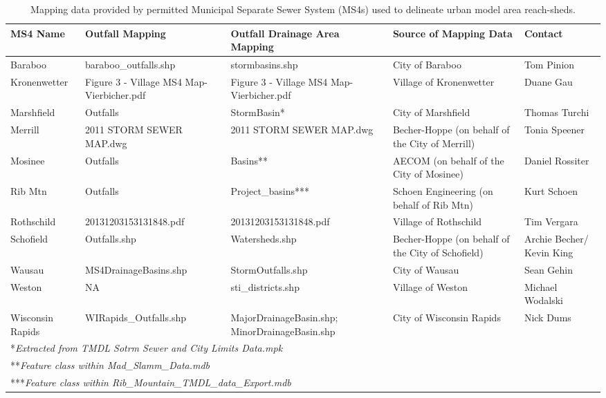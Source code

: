 \begin{landscape}
\begin{table}
\begin{center}
	\caption[Mapping data provided by permitted Municipal Separate Sewer System]{Mapping data provided by permitted Municipal Separate Sewer System (MS4s) used to delineate urban model area reach-sheds.}
	\begin{tabular}{l p{3.5cm} p{3.5cm} p{4cm} p{3cm}}
	\hline
	MS4 Name	&	Outfall Mapping	&	Outfall Drainage Area Mapping	&	Source of Mapping Data	&	Contact	\\
	\hline	\hline
Baraboo 	 	 	& 	 	baraboo\_outfalls.shp	 	 & 	 	stormbasins.shp	 	 & 	 	City of Baraboo 	 	 & 	 	Tom Pinion \\ [0.25ex]
Kronenwetter	 	 & 	 	Figure 3 - Village MS4 Map-Vierbicher.pdf	 	 & 	 	Figure 3 - Village MS4 Map-Vierbicher.pdf	 	 & 	 	Village of Kronenwetter	 	 & 	 	Duane Gau \\[0.25ex]
Marshfield 	 	 & 	 	Outfalls  	 	 	& 	 	StormBasin*	 	 & 	 	City of Marshfield	 	 & 	 	Thomas Turchi \\[0.25ex]
Merrill 	 	 & 	 	2011 STORM SEWER MAP.dwg	 	 & 	 	2011 STORM SEWER MAP.dwg	 	 & 	 	Becher-Hoppe (on behalf of the City of Merrill)	 	 & 	 	Tonia Speener \\[0.25ex]
Mosinee	 	 	& 	 	Outfalls 	 	 	& 	 	Basins**	 	 & 	 	AECOM (on behalf of the City of Mosinee)	 	 & 	 	Daniel Rossiter \\[0.25ex]
Rib Mtn	 	 	& 	 	Outfalls 	 	 	& 	 	Project\_basins***	 	 & 	 	Schoen Engineering (on behalf of Rib Mtn)	 	 & 	 	Kurt Schoen \\[0.25ex]
Rothschild	 	 & 	 	20131203153131848.pdf	 	 & 	 	20131203153131848.pdf	 	 & 	 	Village of Rothschild	 	 & 	 	Tim Vergara \\[0.25ex]
Schofield	 	 & 	 	Outfalls.shp	 	 & 	 	Watersheds.shp	 	 & 	 	Becher-Hoppe (on behalf of the City of Schofield)	 	 & 	 	Archie Becher/ Kevin King \\[0.25ex]
Wausau	 	 	& 	 	MS4DrainageBasins.shp	 	 & 	 	StormOutfalls.shp	 	 & 	 	City of Wausau 	 	 & 	 	Sean Gehin \\[0.25ex]
Weston	 	 	& 	 	NA	 	 			& 	 	sti\_districts.shp	 	 & 	 	Village of Weston	 	 & 	 	Michael Wodalski \\[0.25ex]
Wisconsin Rapids	 						 & 	 	WIRapids\_Outfalls.shp	 	 & 	 	MajorDrainageBasin.shp; MinorDrainageBasin.shp	 	 & 	 	City of Wisconsin Rapids	 	 & 	 	Nick Dums \\[0.25ex]
		\hline
		\multicolumn{5}{l}{*\textit{Extracted from TMDL Sotrm Sewer and City Limits Data.mpk}} \\
		\multicolumn{5}{l}{**\textit{Feature class within Mad\_Slamm\_Data.mdb}} \\
		\multicolumn{5}{l}{***\textit{Feature class within Rib\_Mountain\_TMDL\_data\_Export.mdb}} \\
	\end{tabular}
\label{tab:reachshed_data}
\end{center}
\end{table}
\end{landscape}

